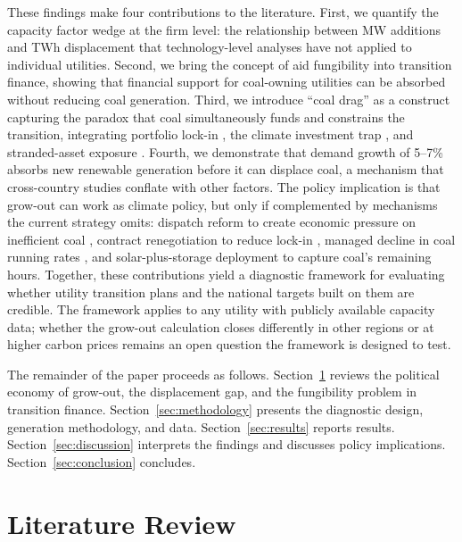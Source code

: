 \documentclass[review,3p,authoryear]{elsarticle}
\begin{document}
These findings make four contributions to the literature. First, we quantify the capacity factor wedge at the firm level: the relationship between MW additions and TWh displacement that technology-level analyses \citep{Patzek2023} have not applied to individual utilities. Second, we bring the concept of aid fungibility \citep{Feyzioglu1998} into transition finance, showing that financial support for coal-owning utilities can be absorbed without reducing coal generation. Third, we introduce ``coal drag'' as a construct capturing the paradox that coal simultaneously funds and constrains the transition, integrating portfolio lock-in \citep{Alova2020}, the climate investment trap \citep{Ameli2021}, and stranded-asset exposure \citep{CarbonTracker2021}. Fourth, we demonstrate that demand growth of 5--7\% absorbs new renewable generation before it can displace coal, a mechanism that cross-country studies conflate with other factors. The policy implication is that grow-out can work as climate policy, but only if complemented by mechanisms the current strategy omits: dispatch reform to create economic pressure on inefficient coal \citep{Yu2023}, contract renegotiation to reduce lock-in \citep{Boute2025}, managed decline in coal running rates \citep{An2025}, and solar-plus-storage deployment to capture coal's remaining hours. Together, these contributions yield a diagnostic framework for evaluating whether utility transition plans and the national targets built on them are credible. The framework applies to any utility with publicly available capacity data; whether the grow-out calculation closes differently in other regions or at higher carbon prices remains an open question the framework is designed to test.

The remainder of the paper proceeds as follows. Section~\ref{sec:literature} reviews the political economy of grow-out, the displacement gap, and the fungibility problem in transition finance. Section~\ref{sec:methodology} presents the diagnostic design, generation methodology, and data. Section~\ref{sec:results} reports results. Section~\ref{sec:discussion} interprets the findings and discusses policy implications. Section~\ref{sec:conclusion} concludes.

\section{Literature Review}
\label{sec:literature}
\end{document}
